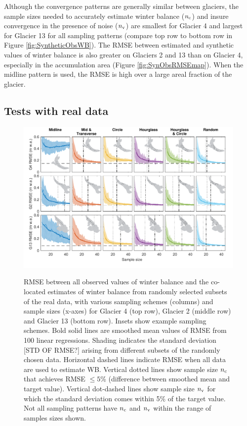 \documentclass[twocolumn,letterpaper]{igs}
\begin{document}
Although the convergence patterns are generally similar between glaciers, the sample sizes needed to accurately estimate winter balance ($n_{\rm c}$) and insure convergence in the presence of noise ($n_{\rm v}$) are smallest for Glacier 4 and largest for Glacier 13 for all sampling patterns (compare top row to bottom row in Figure  \ref{fig:SyntheticObsWB}). The RMSE between estimated and synthetic values of winter balance is also greater on Glaciers 2 and 13 than on Glacier 4, especially in the accumulation area (Figure \ref{fig:SynObsRMSEmap}). When the midline pattern is used, the RMSE is high over a large areal fraction of the glacier.

\subsection{Tests with real data}

\begin{figure}
	\centering
	\includegraphics[width =\textwidth]{DataObsWB.pdf}\\
	\caption{RMSE between all observed values of winter balance and the co-located estimates of winter balance from randomly selected subsets of the real data, with various sampling schemes (columns) and sample sizes (x-axes) for Glacier 4 (top row), Glacier 2 (middle row) and Glacier 13 (bottom row). Insets show example sampling schemes. Bold solid lines are smoothed mean values of RMSE from 100 linear regressions. Shading indicates the standard deviation [STD OF RMSE?] arising from different subsets of the randomly chosen data. Horizontal dashed lines indicate  RMSE when all data are used to estimate WB.  Vertical dotted lines show sample size $n_{\rm c}$ that achieves RMSE $\leq 5$\% (difference between smoothed mean and target value). Vertical dot-dashed lines show sample size $n_{\rm v}$ for which the standard deviation comes within 5\% of the target value. Not all sampling patterns have $n_{\rm c}$ and $n_{\rm v}$ within the range of samples sizes shown.}
	\label{fig:RealObsWB}
\end{figure}
\end{document}
